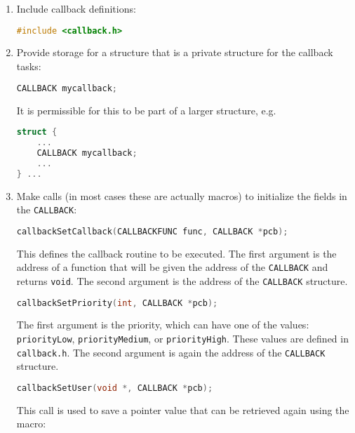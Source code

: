 \begin{enumerate}
\item Include callback definitions:

\begin{lstlisting}[language=C]
#include <callback.h>
\end{lstlisting}

\item Provide storage for a structure that is a private structure for the callback tasks:

\begin{lstlisting}[language=C]
CALLBACK mycallback;
\end{lstlisting}

It is permissible for this to be part of a larger structure, e.g.

\begin{lstlisting}[language=C]
struct {
    ...
    CALLBACK mycallback;
    ...
} ...
\end{lstlisting}

\item Make calls (in most cases these are actually macros) to initialize the fields in the \verb|CALLBACK|:

\begin{lstlisting}[language=C]
callbackSetCallback(CALLBACKFUNC func, CALLBACK *pcb);
\end{lstlisting}

This defines the callback routine to be executed. The first argument is the address of a function that will be given the address of the \verb|CALLBACK| and returns \verb|void|. The second argument is the address of the \verb|CALLBACK| structure.

\begin{lstlisting}[language=C]
callbackSetPriority(int, CALLBACK *pcb);
\end{lstlisting}

The first argument is the priority, which can have one of the values: \verb|priorityLow|, \verb|priorityMedium|, or 
\verb|priorityHigh|. These values are defined in \verb|callback.h|. The second argument is again the address of the 
\verb|CALLBACK| structure.

\begin{lstlisting}[language=C]
callbackSetUser(void *, CALLBACK *pcb);
\end{lstlisting}

This call is used to save a pointer value that can be retrieved again using the macro:


\end{enumerate}
